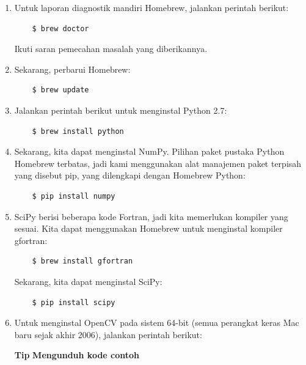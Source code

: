 \begin{enumerate}
	\item Untuk laporan diagnostik mandiri Homebrew, jalankan perintah berikut:
	\begin{verbatim} 
	$ brew doctor
	\end{verbatim}
	Ikuti saran pemecahan masalah yang diberikannya.
	\item Sekarang, perbarui Homebrew:
	\begin{verbatim} 
	$ brew update
	\end{verbatim}
	\item Jalankan perintah berikut untuk menginstal Python 2.7:
	\begin{verbatim} 
	$ brew install python
	\end{verbatim}	
	\item Sekarang, kita dapat menginstal NumPy. Pilihan paket pustaka Python Homebrew terbatas, jadi kami menggunakan alat manajemen paket terpisah yang disebut pip, yang dilengkapi dengan Homebrew Python:
	\begin{verbatim} 
	$ pip install numpy
	\end{verbatim}
	\item SciPy berisi beberapa kode Fortran, jadi kita memerlukan kompiler yang sesuai. Kita dapat menggunakan Homebrew untuk menginstal kompiler gfortran:
	\begin{verbatim} 
	$ brew install gfortran
	\end{verbatim}
	Sekarang, kita dapat menginstal SciPy:
	\begin{verbatim} 
	$ pip install scipy
	\end{verbatim}
	\item Untuk menginstal OpenCV pada sistem 64-bit (semua perangkat keras Mac baru sejak akhir 2006), jalankan
	perintah berikut:
	
\begin{enumerate}

\newpage
\textbf{Tip}
\newline
\textbf{Mengunduh kode contoh}
\newline


\end{enumerate}
\end{enumerate}
